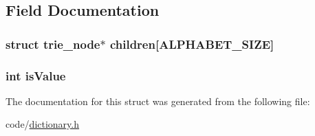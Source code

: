 \subsection{Field Documentation}
\hypertarget{structtrie__node_aaffe5ae4ce6f851acc2d1d620720a31d}{
\subsubsection[{children}]{\setlength{\rightskip}{0pt plus 5cm}struct {\bf trie\+\_\+node}$\ast$ children\mbox{[}{\bf A\+L\+P\+H\+A\+B\+E\+T\+\_\+\+S\+I\+Z\+E}\mbox{]}}}\label{structtrie__node_aaffe5ae4ce6f851acc2d1d620720a31d}
\hypertarget{structtrie__node_a581570ae1f0b19ebd92d9050d0db9308}{
\subsubsection[{is\+Value}]{\setlength{\rightskip}{0pt plus 5cm}int is\+Value}}\label{structtrie__node_a581570ae1f0b19ebd92d9050d0db9308}


The documentation for this struct was generated from the following file\+:\begin{DoxyCompactItemize}
\item 
code/\hyperlink{dictionary_8h}{dictionary.\+h}\end{DoxyCompactItemize}
